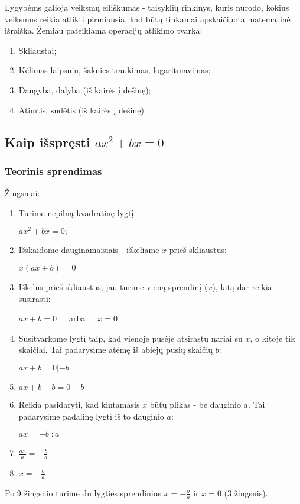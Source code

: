 \documentclass[a4paper]{article}
\begin{document}
Lygybėms galioja veiksmų eiliškumas - taisyklių rinkinys, kuris nurodo, kokius
veiksmus reikia atlikti pirmiausia, kad būtų tinkamai apskaičiuota matematinė
išraiška.
Žemiau pateikiama operacijų atlikimo tvarka:

\begin{enumerate}
      \item Skliaustai;
      \item Kėlimas laipsniu, šaknies traukimas, logaritmavimas;
      \item Daugyba, dalyba (iš kairės į dešinę);
      \item Atimtis, sudėtis (iš kairės į dešinę).
\end{enumerate}

\subsection{Kaip išspręsti $ ax^{2}+bx=0 $}

\subsubsection{Teorinis sprendimas}

Žingsniai:

\begin{enumerate}
      \item Turime nepilną kvadratinę lygtį.

            $ ax^{2}+ bx = 0; $
      \item Išskaidome dauginamaisiais - iškeliame $ x $ prieš skliaustus:

            $ x(ax + b) = 0 $
      \item Iškėlus prieš skliaustus, jau turime vieną sprendinį ($ x $), kitą
            dar reikia susirasti:

            $ ax+b = 0 $ $\;\;\;$ arba $\;\;\;$ $ x=0 $
      \item Susitvarkome lygtį taip, kad vienoje pusėje atsirastų nariai su $ x
            $, o kitoje tik skaičiai. Tai padarysime atėmę iš abiejų pusių
            skaičių $ b $:

            $ ax+b = 0 | - b $
      \item  $ ax+b-b = 0-b $
      \item Reikia pasidaryti, kad kintamasis $ x $ būtų plikas - be dauginio $
                  a
            $. Tai padarysime padalinę lygtį iš to dauginio $ a $:

            $ ax = -b | : a $
      \item $ \frac{ax}{a} = -\frac{b}{a} $
      \item $ x = -\frac{b}{a} $
\end{enumerate}
Po 9 žingsnio turime du lygties sprendinius $ x = -\frac{b}{a} $ ir $ x=0 $ (3
žingsnis).
\end{document}

